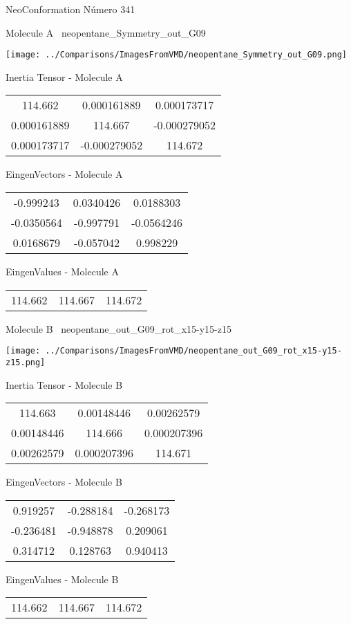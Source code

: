 \vtab[-3cm]
\begin{center}
{\large NeoConformation \tab Número 341}
\end{center}
\begin{multicols}{2}
\begin{center}

Molecule A \
neopentane\_Symmetry\_out\_G09

\texttt{[image: ../Comparisons/ImagesFromVMD/neopentane\_Symmetry\_out\_G09.png]}

Inertia Tensor - Molecule A \\
\begin{tabular}{|c c c|}
114.662	 & 	0.000161889	 & 	0.000173717	 \\
0.000161889	 & 	114.667	 & 	-0.000279052	 \\
0.000173717	 & 	-0.000279052	 & 	114.672
\end{tabular}

\vtab
 EingenVectors - Molecule A     \\
\begin{tabular}{|c c c|}
-0.999243	 & 	0.0340426	 & 	0.0188303	 \\
-0.0350564	 & 	-0.997791	 & 	-0.0564246	 \\
0.0168679	 & 	-0.057042	 & 	0.998229
\end{tabular}

\vtab
 EingenValues - Molecule A     \\
\begin{tabular}{|c c c|}
114.662	 & 	114.667	 & 	114.672	 \\
\end{tabular}
\columnbreak

Molecule B \
neopentane\_out\_G09\_rot\_x15-y15-z15

\texttt{[image: ../Comparisons/ImagesFromVMD/neopentane\_out\_G09\_rot\_x15-y15-z15.png]}

Inertia Tensor - Molecule B \\
\begin{tabular}{|c c c|}
114.663	 & 	0.00148446	 & 	0.00262579	 \\
0.00148446	 & 	114.666	 & 	0.000207396	 \\
0.00262579	 & 	0.000207396	 & 	114.671
\end{tabular}

\vtab
 EingenVectors - Molecule B     \\
\begin{tabular}{|c c c|}
0.919257	 & 	-0.288184	 & 	-0.268173	 \\
-0.236481	 & 	-0.948878	 & 	0.209061	 \\
0.314712	 & 	0.128763	 & 	0.940413
\end{tabular}

\vtab
 EingenValues - Molecule B     \\
\begin{tabular}{|c c c|}
114.662	 & 	114.667	 & 	114.672	 \\
\end{tabular}

\end{center}
\end{multicols}

